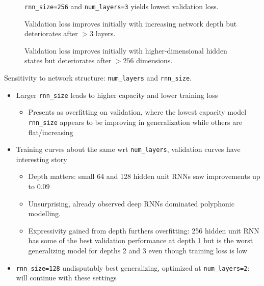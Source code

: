 \begin{figure}[tb]
    \centering
    
    \caption{\texttt{rnn\_size=256} and \texttt{num\_layers=3} yields lowest validation loss.}
    \label{fig:torch-rnn-network-params}
\end{figure}

\begin{figure}[tb]
  \centering
  
  \caption{Validation loss improves initially with increasing network depth but deteriorates after $>3$ layers.}
  \label{fig:torch-rnn-network-params-num-layers}
\end{figure}

\begin{figure}[tb]
  \centering
  
  \caption{Validation loss improves initially with higher-dimensional hidden states
  but deteriorates after $>256$ dimensions.}
  \label{fig:torch-rnn-network-params-rnn-size}
\end{figure}

Sensitivity to network structure: \texttt{num\_layers} and \texttt{rnn\_size}.
\begin{itemize}
    \item Larger \texttt{rnn\_size} leads to higher capacity and lower training loss
        \begin{itemize}
            \item Presents as overfitting on validation, where the lowest capacity
                model \texttt{rnn\_size} appears to be improving in generalization while
                others are flat/increasing
        \end{itemize}
    \item Training curves about the same wrt \texttt{num\_layers}, validation curves have interesting story
        \begin{itemize}
            \item Depth matters: small 64 and 128 hidden unit RNNs saw improvements up to 0.09
            \item Unsurprising, \citet{pascanu2013construct} already observed deep RNNs dominated polyphonic modelling.
            \item Expressivity gained from depth furthers overfitting: 256
                hidden unit RNN has some of the best validation performance at
                depth 1 but is the worst generalizing model for depths 2
                and 3 even though training loss is low
        \end{itemize}
    \item \texttt{rnn\_size=128} undisputably best generalizing, optimized at
        \texttt{num\_layers=2}: will continue with these settings
\end{itemize}

